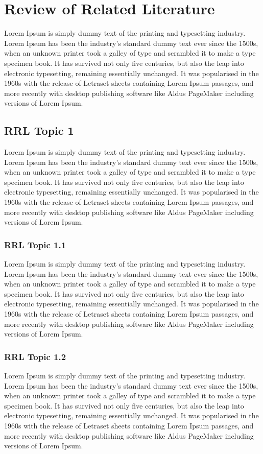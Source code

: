 \newpage
\section{Review of Related Literature}
\label{Review of Related Literature} 
Lorem Ipsum is simply dummy text of the printing and typesetting industry. Lorem Ipsum has been the industry's standard dummy text ever since the 1500s, when an unknown printer took a galley of type and scrambled it to make a type specimen book. It has survived not only five centuries, but also the leap into electronic typesetting, remaining essentially unchanged. It was popularised in the 1960s with the release of Letraset sheets containing Lorem Ipsum passages, and more recently with desktop publishing software like Aldus PageMaker including versions of Lorem Ipsum.

\subsection{RRL Topic 1}
Lorem Ipsum\cite{DUMMY:1} is simply dummy text of the printing and typesetting industry. Lorem Ipsum has been the industry's standard dummy text ever since the 1500s, when an unknown printer took a galley of type and scrambled it to make a type specimen book. It has survived not only five centuries, but also the leap into electronic typesetting, remaining essentially unchanged. It was popularised in the 1960s with the release of Letraset sheets containing Lorem Ipsum passages, and more recently with desktop publishing software like Aldus PageMaker including versions of Lorem Ipsum.

\subsubsection{RRL Topic 1.1}
Lorem Ipsum\cite{DUMMY:1} is simply dummy text of the printing and typesetting industry. Lorem Ipsum has been the industry's standard dummy text ever since the 1500s, when an unknown printer took a galley of type and scrambled it to make a type specimen book. It has survived not only five centuries, but also the leap into electronic typesetting, remaining essentially unchanged. It was popularised in the 1960s with the release of Letraset sheets containing Lorem Ipsum passages, and more recently with desktop publishing software like Aldus PageMaker including versions of Lorem Ipsum.

\subsubsection{RRL Topic 1.2}
Lorem Ipsum\cite{DUMMY:1} is simply dummy text of the printing and typesetting industry. Lorem Ipsum has been the industry's standard dummy text ever since the 1500s, when an unknown printer took a galley of type and scrambled it to make a type specimen book. It has survived not only five centuries, but also the leap into electronic typesetting, remaining essentially unchanged. It was popularised in the 1960s with the release of Letraset sheets containing Lorem Ipsum passages, and more recently with desktop publishing software like Aldus PageMaker including versions of Lorem Ipsum.

